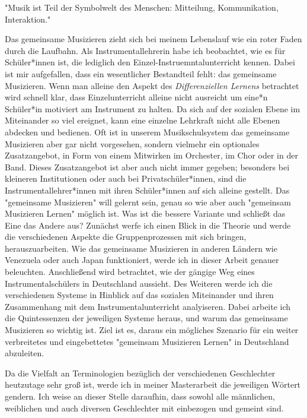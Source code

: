 
"Musik ist Teil der Symbolwelt des Menschen: Mitteilung, Kommunikation,
Interaktion." \autocite[91]{doerne:umfassend_musizieren}

Das gemeinsame Musizieren zieht sich bei meinem Lebenslauf wie ein roter Faden
durch die Laufbahn. Als Instrumentallehrerin habe ich beobachtet, wie es für
Schüler*innen ist, die lediglich den Einzel-Instruemntalunterricht kennen. Dabei ist
mir aufgefallen, dass ein wesentlicher Bestandteil fehlt: das gemeinsame
Musizieren. Wenn man alleine den Aspekt des \emph{Differenziellen Lernens} betrachtet
wird schnell klar, dass Einzelunterricht alleine nicht ausreicht um eine*n
Schüler*in motiviert am Instrument zu halten. Da sich auf der sozialen Ebene im
Miteinander so viel ereignet, kann eine einzelne Lehrkraft nicht alle Ebenen
abdecken und bedienen. Oft ist in unserem Musikschulsystem das gemeinsame
Musizieren aber gar nicht vorgesehen, sondern vielmehr ein optionales
Zusatzangebot, in Form von einem Mitwirken im Orchester, im Chor oder in der
Band. Dieses Zusatzangebot ist aber auch nicht immer gegeben; besonders bei
kleineren Institutionen oder auch bei Privatschüler*innen, sind die
Instrumentallehrer*innen mit ihren Schüler*innen auf sich alleine gestellt. Das "gemeinsame
Musizieren" will gelernt sein, genau so wie aber auch "gemeinsam Musizieren
Lernen" möglich ist. Was ist die bessere Variante und schließt das Eine das
Andere aus? Zunächst werfe ich einen Blick in die Theorie und werde die
verschiedenen Aspekte die Gruppenprozessen mit sich bringen, herauszuarbeiten.
Wie das gemeinsame Musizieren in anderen Ländern wie Venezuela oder auch Japan
funktioniert, werde ich in dieser Arbeit genauer beleuchten. Anschließend wird
betrachtet, wie der gängige Weg eines Instrumentalschülers in Deutschland
aussieht. Des Weiteren werde ich die verschiedenen Systeme in Hinblick auf das
sozialen Miteinander und ihren Zusammenhang mit dem Instrumentalunterricht
analyiseren. Dabei arbeite ich die Quintessenzen der jeweiligen Systeme heraus,
und warum das gemeinsame Musizieren so wichtig ist. Ziel ist es, daraus ein
mögliches Szenario für ein weiter verbreitetes und eingebettetes "gemeinsam
Musizieren Lernen" in Deutschland abzuleiten.


Da die Vielfalt an Terminologien bezüglich der verschiedenen Geschlechter
heutzutage sehr groß ist, werde ich in meiner Masterarbeit
die jeweiligen Wörtert gendern. Ich weise an dieser Stelle
daraufhin, dass sowohl alle männlichen, weiblichen und auch diversen
Geschlechter mit einbezogen und gemeint sind. 
